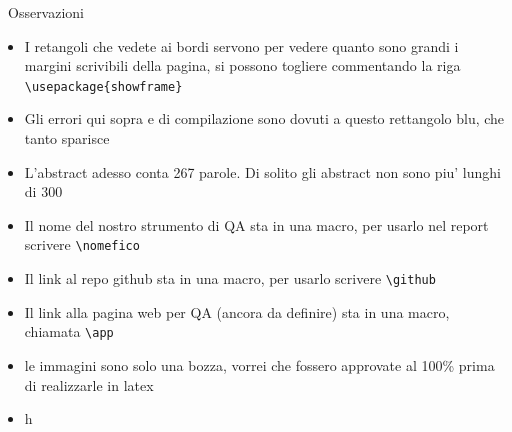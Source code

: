 \documentclass[11pt,hidelinks]{article}
\begin{document}
\begin{mydisclaimer}{{\large {}} \,  Osservazioni}
\begin{itemize}
    \item I retangoli che vedete ai bordi servono per vedere quanto sono grandi i margini scrivibili della pagina, si possono togliere commentando la riga \texttt{\textbackslash usepackage\{showframe\}}
    \item Gli errori qui sopra e di compilazione sono dovuti a questo rettangolo blu, che tanto sparisce
    \item L'abstract adesso conta 267 parole. Di solito gli abstract non sono piu' lunghi di 300
    \item Il nome del nostro strumento di QA sta in una macro, per usarlo nel report scrivere \texttt{\textbackslash nomefico}
    \item Il link al repo github sta in una macro, per usarlo scrivere \texttt{\textbackslash github}
    \item Il link alla pagina web per QA (ancora da definire) sta in una macro, chiamata \texttt{\textbackslash app}
    \item le immagini sono solo una bozza, vorrei che fossero approvate al 100\% prima di realizzarle in latex
    \item h
\end{itemize}
\end{mydisclaimer}

\newpage
\end{document}
